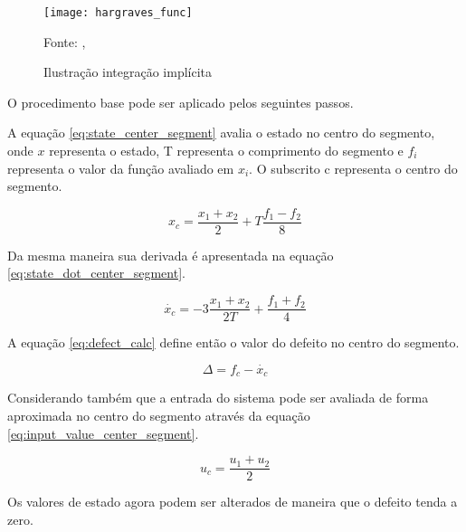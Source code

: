 \begin{figure}[H]
    \centering
    \caption{Ilustração integração implícita}
    \texttt{[image: hargraves\_func]}

    {\footnotesize Fonte: \citeauthor{hargraves87}, \citeyear{hargraves87}}
    \label{fig:hargraves_fun}
\end{figure}

O procedimento base pode ser aplicado pelos seguintes passos.

A equação \ref{eq:state_center_segment} avalia o estado no centro do segmento, onde $x$ representa o estado, T representa o comprimento do segmento e $f_i$ representa o valor da função avaliado em $x_i$. O subscrito c representa o centro do segmento.

\begin{equation}
    \label{eq:state_center_segment}
    x_c = \frac{x_{1} + x_{2}}{2} + T\frac{f_{1} - f_{2}}{8}
\end{equation}

Da mesma maneira sua derivada é apresentada na equação \ref{eq:state_dot_center_segment}.

\begin{equation}
    \label{eq:state_dot_center_segment}
    \dot{x_{c}} = -3\frac{x_{1} + x_{2}}{2T} + \frac{f_{1} + f_{2}}{4}
\end{equation}

A equação \ref{eq:defect_calc} define então o valor do defeito no centro do segmento.

\begin{equation}
    \label{eq:defect_calc}
    \Delta = f_c - \dot{x_c}
\end{equation}

Considerando também que a entrada do sistema pode ser avaliada de forma aproximada no centro do segmento através da equação \ref{eq:input_value_center_segment}.

\begin{equation}
    \label{eq:input_value_center_segment}
    u_c = \frac{u_1 + u_2}{2}
\end{equation}

Os valores de estado agora podem ser alterados de maneira que o defeito tenda a zero.